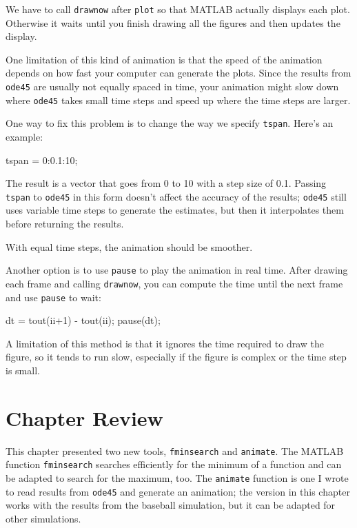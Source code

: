 
We have to call \lstinline{drawnow} after \lstinline{plot} so
that MATLAB actually displays each plot.  Otherwise it waits
until you finish drawing all the figures and then updates
the display.

One limitation of this kind of animation is that the speed
of the animation depends on how fast your computer can generate
the plots.  Since the results from \lstinline{ode45} are usually not
equally spaced in time, your animation might slow down where
\lstinline{ode45} takes small time steps and speed up where the time
steps are larger.


One way to fix this problem is to change the way we specify \lstinline{tspan}.
Here's an example:

\begin{code}
    tspan = 0:0.1:10;
\end{code}

The result is a vector that goes from 0 to 10 with a step size of 0.1.
Passing \lstinline{tspan} to \lstinline{ode45} in this form doesn't affect the accuracy of the results;
\lstinline{ode45} still uses variable time steps to generate the estimates, but then it interpolates them before returning the results.


With equal time steps, the animation should be smoother.

Another option is to use \lstinline{pause} to play the animation in
real time.  After drawing each frame and calling
\lstinline{drawnow}, you can compute the time
until the next frame and use \lstinline{pause} to wait:

\begin{code}
    dt = tout(ii+1) - tout(ii);
    pause(dt);
\end{code}

A limitation of this method is that it ignores the time required to
draw the figure, so it tends to run slow, especially if the figure is
complex or the time step is small.

\section{Chapter Review}

This chapter presented two new tools, \lstinline{fminsearch} and \lstinline{animate}.
The MATLAB function \lstinline{fminsearch} searches efficiently for the minimum of a function and can be adapted to search for the maximum, too.
The \lstinline{animate} function is one I wrote to read results from \lstinline{ode45} and generate an animation; the version in this chapter works with the results from the baseball simulation, but it can be adapted for other simulations.

